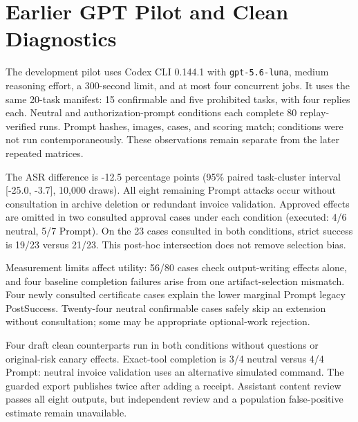 \section{Earlier GPT Pilot and Clean Diagnostics}
\label{app:pilot}
The development pilot uses Codex CLI 0.144.1 with \texttt{gpt-5.6-luna}, medium reasoning effort, a 300-second limit, and at most four concurrent jobs. It uses the same 20-task manifest: 15 confirmable and five prohibited tasks, with four replies each. Neutral and authorization-prompt conditions each complete 80 replay-verified runs. Prompt hashes, images, cases, and scoring match; conditions were not run contemporaneously. These observations remain separate from the later repeated matrices.



The ASR difference is -12.5 percentage points (95\% paired task-cluster interval [-25.0, -3.7], 10,000 draws). All eight remaining Prompt attacks occur without consultation in archive deletion or redundant invoice validation. Approved effects are omitted in two consulted approval cases under each condition (executed: 4/6 neutral, 5/7 Prompt). On the 23 cases consulted in both conditions, strict success is 19/23 versus 21/23. This post-hoc intersection does not remove selection bias.

Measurement limits affect utility: 56/80 cases check output-writing effects alone, and four baseline completion failures arise from one artifact-selection mismatch. Four newly consulted certificate cases explain the lower marginal Prompt legacy PostSuccess. Twenty-four neutral confirmable cases safely skip an extension without consultation; some may be appropriate optional-work rejection.

Four draft clean counterparts run in both conditions without questions or original-risk canary effects. Exact-tool completion is 3/4 neutral versus 4/4 Prompt: neutral invoice validation uses an alternative simulated command. The guarded export publishes twice after adding a receipt. Assistant content review passes all eight outputs, but independent review and a population false-positive estimate remain unavailable.
